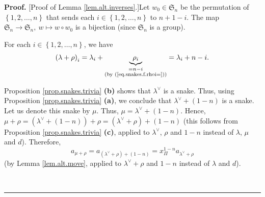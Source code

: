 \documentclass[numbers=enddot,12pt,final,onecolumn,notitlepage]{scrartcl}%
\theoremstyle{definition}
\newenvironment{proof}[1][Proof]{\noindent\textbf{#1.} }{\ \rule{0.5em}{0.5em}}
\begin{document}
\begin{proof}
[Proof of Lemma \ref{lem.alt.inverses}.]Let $w_{0}\in\mathfrak{S}_{n}$ be the
permutation of $\left\{  1,2,\ldots,n\right\}  $ that sends each $i\in\left\{
1,2,\ldots,n\right\}  $ to $n+1-i$. The map $\mathfrak{S}_{n}\rightarrow
\mathfrak{S}_{n},\ w\mapsto w\circ w_{0}$ is a bijection (since $\mathfrak{S}%
_{n}$ is a group).

For each $i\in\left\{  1,2,\ldots,n\right\}  $, we have
\begin{equation}
\left(  \lambda+\rho\right)  _{i}=\lambda_{i}+\underbrace{\rho_{i}%
}_{\substack{=n-i\\\text{(by (\ref{eq.snakes.f.rhoi=}))}}}=\lambda_{i}+n-i.
\label{pf.lem.alt.inverses.rho2}%
\end{equation}


Proposition \ref{prop.snakes.trivia} \textbf{(b)} shows that $\lambda^{\vee}$
is a snake. Thus, using Proposition \ref{prop.snakes.trivia} \textbf{(a)}, we
conclude that $\lambda^{\vee}+\left(  1-n\right)  $ is a snake. Let us denote
this snake by $\mu$. Thus, $\mu=\lambda^{\vee}+\left(  1-n\right)  $. Hence,
$\mu+\rho=\left(  \lambda^{\vee}+\left(  1-n\right)  \right)  +\rho=\left(
\lambda^{\vee}+\rho\right)  +\left(  1-n\right)  $ (this follows from
Proposition \ref{prop.snakes.trivia} \textbf{(c)}, applied to $\lambda^{\vee}%
$, $\rho$ and $1-n$ instead of $\lambda$, $\mu$ and $d$). Therefore,%
\begin{equation}
a_{\mu+\rho}=a_{\left(  \lambda^{\vee}+\rho\right)  +\left(  1-n\right)
}=x_{\Pi}^{1-n}a_{\lambda^{\vee}+\rho} \label{pf.lem.alt.inverses.0}%
\end{equation}
(by Lemma \ref{lem.alt.move}, applied to $\lambda^{\vee}+\rho$ and $1-n$
instead of $\lambda$ and $d$).


\end{proof}
\end{document}
